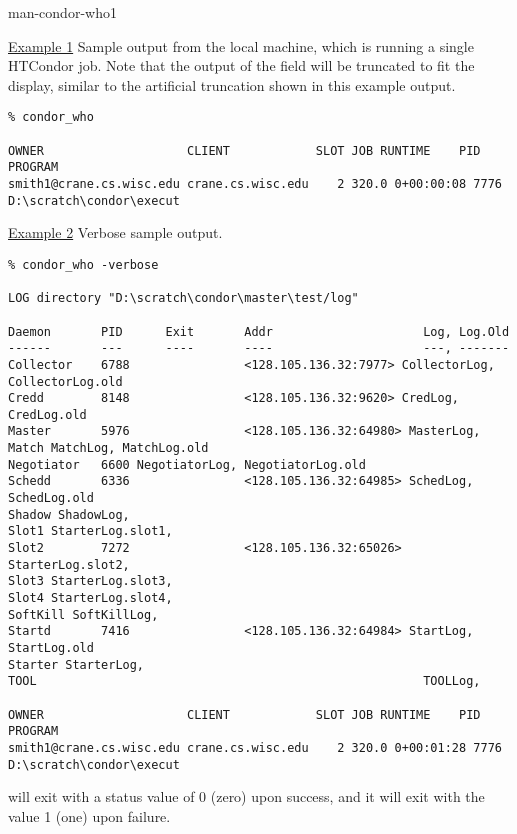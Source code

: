\begin{ManPage}{}{man-condor-who}{1}
\Examples

\underline{Example 1} Sample output from the local machine,
which is running a single HTCondor job.
Note that the output of the  field will be truncated
to fit the display, similar to the artificial truncation shown in this 
example output.
\footnotesize
\begin{verbatim}
% condor_who 

OWNER                    CLIENT            SLOT JOB RUNTIME    PID    PROGRAM
smith1@crane.cs.wisc.edu crane.cs.wisc.edu    2 320.0 0+00:00:08 7776 D:\scratch\condor\execut
\end{verbatim}
\normalsize

\underline{Example 2} Verbose sample output.
\footnotesize
\begin{verbatim}
% condor_who -verbose

LOG directory "D:\scratch\condor\master\test/log"

Daemon       PID      Exit       Addr                     Log, Log.Old
------       ---      ----       ----                     ---, -------
Collector    6788                <128.105.136.32:7977> CollectorLog, CollectorLog.old
Credd        8148                <128.105.136.32:9620> CredLog, CredLog.old
Master       5976                <128.105.136.32:64980> MasterLog,
Match MatchLog, MatchLog.old
Negotiator   6600 NegotiatorLog, NegotiatorLog.old
Schedd       6336                <128.105.136.32:64985> SchedLog, SchedLog.old
Shadow ShadowLog,
Slot1 StarterLog.slot1,
Slot2        7272                <128.105.136.32:65026> StarterLog.slot2,
Slot3 StarterLog.slot3,
Slot4 StarterLog.slot4,
SoftKill SoftKillLog,
Startd       7416                <128.105.136.32:64984> StartLog, StartLog.old
Starter StarterLog,
TOOL                                                      TOOLLog,

OWNER                    CLIENT            SLOT JOB RUNTIME    PID    PROGRAM
smith1@crane.cs.wisc.edu crane.cs.wisc.edu    2 320.0 0+00:01:28 7776 D:\scratch\condor\execut
\end{verbatim}
\normalsize

\ExitStatus

 will exit with a status value of 0 (zero) upon success,
and it will exit with the value 1 (one) upon failure.

\end{ManPage}

